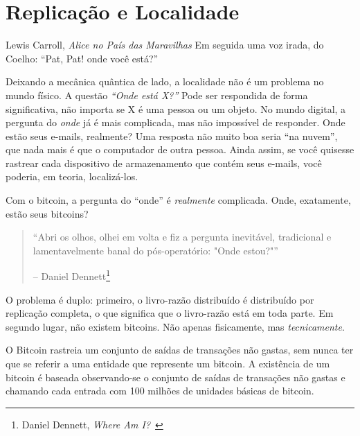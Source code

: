 \chapter{Replicação e Localidade}
\label{les:3}

\begin{chapquote}{Lewis Carroll, \textit{Alice no País das Maravilhas}}
Em seguida uma voz irada, do Coelho: \enquote{Pat, Pat! onde você está?}
\end{chapquote}

Deixando a mecânica quântica de lado, a localidade não é um problema no mundo físico. A questão \textit{\enquote{Onde está X?}} Pode ser respondida de forma significativa, não importa se X é uma pessoa ou um objeto. No mundo digital, a pergunta do \textit{onde} já é mais complicada, mas não impossível de responder. Onde estão seus e-mails, realmente? Uma resposta não muito boa seria \enquote{na nuvem}, que nada mais é que o computador de outra pessoa. Ainda assim, se você quisesse rastrear cada dispositivo de armazenamento que contém seus e-mails, você poderia, em teoria, localizá-los.

Com o bitcoin, a pergunta do \enquote{onde} é \textit{realmente} complicada. Onde, exatamente, estão seus bitcoins?

\begin{quotation}\begin{samepage}
\enquote{Abri os olhos, olhei em volta e fiz a pergunta inevitável, tradicional e lamentavelmente banal do pós-operatório: "Onde estou?"}
\begin{flushright} -- Daniel Dennett\footnote{Daniel Dennett, \textit{Where Am I?}~\cite{where-am-i}}
\end{flushright}\end{samepage}\end{quotation}

O problema é duplo: primeiro, o livro-razão distribuído é distribuído por replicação completa, o que significa que o livro-razão está em toda parte. Em segundo lugar, não existem bitcoins. Não apenas fisicamente, mas \textit{tecnicamente}.

O Bitcoin rastreia um conjunto de saídas de transações não gastas, sem nunca ter que se referir a uma entidade que represente um bitcoin. A existência de um bitcoin é baseada observando-se o conjunto de saídas de transações não gastas e chamando cada entrada com 100 milhões de unidades básicas de bitcoin.

